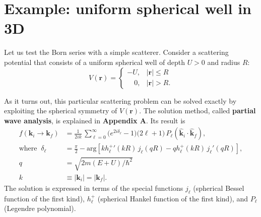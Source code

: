 \documentclass[prx,12pt]{revtex4-2}
\begin{document}
\section{Example: uniform spherical well in 3D}

Let us test the Born series with a simple scatterer.  Consider a
scattering potential that consists of a uniform spherical well of
depth $U > 0$ and radius $R$:
\begin{equation}
  V(\mathbf{r}) = \begin{cases}-U, & |\mathbf{r}| \le R \\ \;\;\;\,0,
    & |\mathbf{r}| > R. \end{cases}
\end{equation}

As it turns out, this particular scattering problem can be solved
exactly by exploiting the spherical symmetry of $V(\mathbf{r})$.  The
solution method, called \textbf{partial wave analysis}, is explained
in \textbf{Appendix A}.  Its result is
\begin{equation}
  \begin{aligned}f(\mathbf{k}_i \rightarrow \mathbf{k}_f) &= \frac{1}{2ik}\, \sum_{\ell =0}^\infty \big(e^{2i\delta_\ell} - 1\big) \big(2\ell+1\big)\, P_{\ell}(\hat{\mathbf{k}}_i\cdot \hat{\mathbf{k}}_f), \\ \mathrm{where}\;\; \delta_\ell &= \frac{\pi}{2} - \mathrm{arg}\!\left[k {h_\ell^+}'(kR) \, j_\ell(qR) - qh_\ell^+(kR)\, j_\ell'(qR)\right], \\ q &= \sqrt{2m(E+U)/\hbar^2} \\ k &\equiv |\mathbf{k}_i| = |\mathbf{k}_f|.\end{aligned}
  \label{fresult_well}
\end{equation}
The solution is expressed in terms of the special functions $j_\ell$
(spherical Bessel function of the first kind), $h_\ell^+$ (spherical
Hankel function of the first kind), and $P_\ell$ (Legendre
polynomial).
\end{document}
